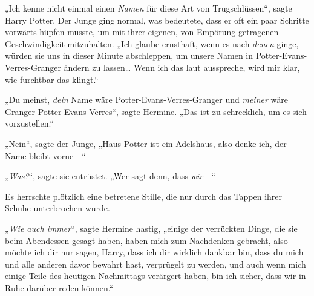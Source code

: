„Ich kenne nicht einmal einen \emph{Namen} für diese Art von Trugschlüssen“, sagte Harry Potter. Der Junge ging normal, was bedeutete, dass er oft ein paar Schritte vorwärts hüpfen musste, um mit ihrer eigenen, von Empörung getragenen Geschwindigkeit mitzuhalten. „Ich glaube ernsthaft, wenn es nach \emph{denen} ginge, würden sie uns in dieser Minute abschleppen, um unsere Namen in Potter-Evans-Verres-Granger ändern zu lassen… Wenn ich das laut ausspreche, wird mir klar, wie furchtbar das klingt.“

„Du meinst, \emph{dein} Name wäre Potter-Evans-Verres-Granger und \emph{meiner} wäre Granger-Potter-Evans-Verres“, sagte Hermine. „Das ist zu schrecklich, um es sich vorzustellen.“

„Nein“, sagte der Junge, „Haus Potter ist ein Adelshaus, also denke ich, der Name bleibt vorne—“

„\emph{Was?}“, sagte sie entrüstet. „Wer sagt denn, dass \emph{wir}—“

Es herrschte plötzlich eine betretene Stille, die nur durch das Tappen ihrer Schuhe unterbrochen wurde.

„\emph{Wie auch immer}“, sagte Hermine hastig, „einige der verrückten Dinge, die sie beim Abendessen gesagt haben, haben mich zum Nachdenken gebracht, also möchte ich dir nur sagen, Harry, dass ich dir wirklich dankbar bin, dass du mich und alle anderen davor bewahrt hast, verprügelt zu werden, und auch wenn mich einige Teile des heutigen Nachmittags verärgert haben, bin ich sicher, dass wir in Ruhe darüber reden können.“

